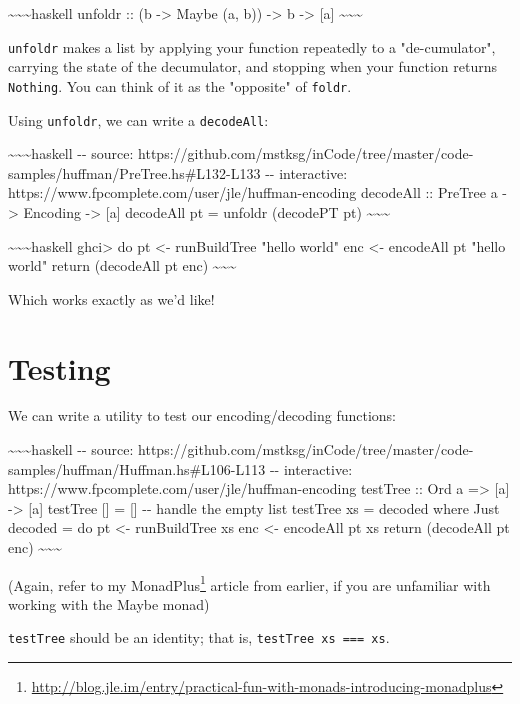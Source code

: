 \documentclass[]{article}
\renewcommand{\href}[2]{#2\footnote{\url{#1}}}
\begin{document}
\textasciitilde{}\textasciitilde{}\textasciitilde{}haskell unfoldr :: (b
-\textgreater{} Maybe (a, b)) -\textgreater{} b -\textgreater{} {[}a{]}
\textasciitilde{}\textasciitilde{}\textasciitilde{}

\texttt{unfoldr} makes a list by applying your function repeatedly to a
"de-cumulator", carrying the state of the decumulator, and stopping when your
function returns \texttt{Nothing}. You can think of it as the "opposite" of
\texttt{foldr}.

Using \texttt{unfoldr}, we can write a \texttt{decodeAll}:

\textasciitilde{}\textasciitilde{}\textasciitilde{}haskell -\/- source:
https://github.com/mstksg/inCode/tree/master/code-samples/huffman/PreTree.hs\#L132-L133
-\/- interactive: https://www.fpcomplete.com/user/jle/huffman-encoding decodeAll
:: PreTree a -\textgreater{} Encoding -\textgreater{} {[}a{]} decodeAll pt =
unfoldr (decodePT pt) \textasciitilde{}\textasciitilde{}\textasciitilde{}

\textasciitilde{}\textasciitilde{}\textasciitilde{}haskell ghci\textgreater{} do
pt \textless{}- runBuildTree "hello world" \textbar{} enc \textless{}- encodeAll
pt "hello world" \textbar{} return (decodeAll pt enc)
\textasciitilde{}\textasciitilde{}\textasciitilde{}

Which works exactly as we'd like!

\section{Testing}

We can write a utility to test our encoding/decoding functions:

\textasciitilde{}\textasciitilde{}\textasciitilde{}haskell -\/- source:
https://github.com/mstksg/inCode/tree/master/code-samples/huffman/Huffman.hs\#L106-L113
-\/- interactive: https://www.fpcomplete.com/user/jle/huffman-encoding testTree
:: Ord a =\textgreater{} {[}a{]} -\textgreater{} {[}a{]} testTree {[}{]} =
{[}{]} -\/- handle the empty list testTree xs = decoded where Just decoded = do
pt \textless{}- runBuildTree xs enc \textless{}- encodeAll pt xs return
(decodeAll pt enc) \textasciitilde{}\textasciitilde{}\textasciitilde{}

(Again, refer to my
\href{http://blog.jle.im/entry/practical-fun-with-monads-introducing-monadplus}{MonadPlus}
article from earlier, if you are unfamiliar with working with the Maybe monad)

\texttt{testTree} should be an identity; that is,
\texttt{testTree\ xs\ ===\ xs}.
\end{document}
